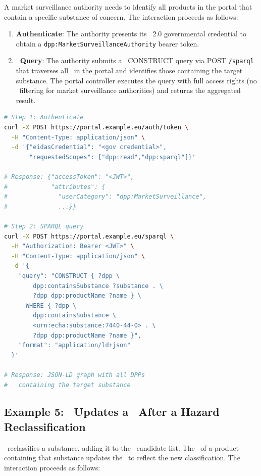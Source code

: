 A market surveillance authority needs to identify all products in the portal
that contain a specific substance of concern. The interaction proceeds as
follows:

\begin{enumerate}
\item \textbf{Authenticate}: The authority presents its \eIDAS~2.0 governmental
credential to obtain a \texttt{dpp:MarketSurveillanceAuthority} bearer token.
\item \textbf{\SPARQL\ Query}: The authority submits a \SPARQL\ CONSTRUCT query
via POST \texttt{/sparql} that traverses all \DPPs\ in the portal and identifies
those containing the target substance. The portal controller executes the query
with full access rights (no \ODRL\ filtering for market surveillance
authorities) and returns the aggregated result.
\end{enumerate}

\begin{lstlisting}[language=bash,breaklines=true,breakatwhitespace=true]
# Step 1: Authenticate
curl -X POST https://portal.example.eu/auth/token \
  -H "Content-Type: application/json" \
  -d '{"eidasCredential": "<gov credential>",
       "requestedScopes": ["dpp:read","dpp:sparql"]}'

# Response: {"accessToken": "<JWT>",
#            "attributes": {
#              "userCategory": "dpp:MarketSurveillance",
#              ...}}

# Step 2: SPARQL query
curl -X POST https://portal.example.eu/sparql \
  -H "Authorization: Bearer <JWT>" \
  -H "Content-Type: application/json" \
  -d '{
    "query": "CONSTRUCT { ?dpp \
        dpp:containsSubstance ?substance . \
        ?dpp dpp:productName ?name } \
      WHERE { ?dpp \
        dpp:containsSubstance \
        <urn:echa:substance:7440-44-0> . \
        ?dpp dpp:productName ?name }",
    "format": "application/ld+json"
  }'

# Response: JSON-LD graph with all DPPs
#   containing the target substance
\end{lstlisting}

\subsection{Example 5: \REO\ Updates a \DPP\ After a Hazard Reclassification}

\ECHA\ reclassifies a substance, adding it to the \SVHC\ candidate list. The
\REO\ of a product containing that substance updates the \DPP\ to reflect the
new classification. The interaction proceeds as follows:

